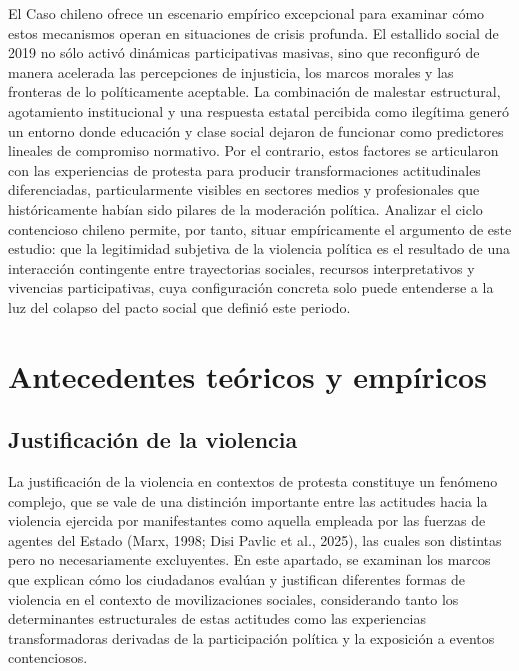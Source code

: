 \documentclass[
  13pt,
]{article}
\begin{document}
El Caso chileno ofrece un escenario empírico excepcional para examinar
cómo estos mecanismos operan en situaciones de crisis profunda. El
estallido social de 2019 no sólo activó dinámicas participativas
masivas, sino que reconfiguró de manera acelerada las percepciones de
injusticia, los marcos morales y las fronteras de lo políticamente
aceptable. La combinación de malestar estructural, agotamiento
institucional y una respuesta estatal percibida como ilegítima generó un
entorno donde educación y clase social dejaron de funcionar como
predictores lineales de compromiso normativo. Por el contrario, estos
factores se articularon con las experiencias de protesta para producir
transformaciones actitudinales diferenciadas, particularmente visibles
en sectores medios y profesionales que históricamente habían sido
pilares de la moderación política. Analizar el ciclo contencioso chileno
permite, por tanto, situar empíricamente el argumento de este estudio:
que la legitimidad subjetiva de la violencia política es el resultado de
una interacción contingente entre trayectorias sociales, recursos
interpretativos y vivencias participativas, cuya configuración concreta
solo puede entenderse a la luz del colapso del pacto social que definió
este periodo.

\section{Antecedentes teóricos y
empíricos}\label{antecedentes-teuxf3ricos-y-empuxedricos}

\subsection{Justificación de la
violencia}\label{justificaciuxf3n-de-la-violencia}

La justificación de la violencia en contextos de protesta constituye un
fenómeno complejo, que se vale de una distinción importante entre las
actitudes hacia la violencia ejercida por manifestantes como aquella
empleada por las fuerzas de agentes del Estado (Marx, 1998; Disi Pavlic
et al., 2025), las cuales son distintas pero no necesariamente
excluyentes. En este apartado, se examinan los marcos que explican cómo
los ciudadanos evalúan y justifican diferentes formas de violencia en el
contexto de movilizaciones sociales, considerando tanto los
determinantes estructurales de estas actitudes como las experiencias
transformadoras derivadas de la participación política y la exposición a
eventos contenciosos.
\end{document}
